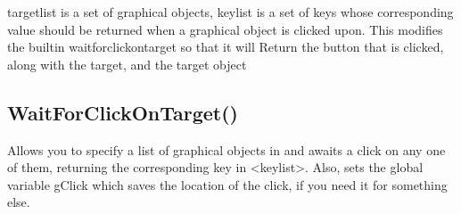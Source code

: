 \documentclass[letterpaper,10pt,english]{sphinxmanual}
\begin{document}
\sphinxAtStartPar
targetlist is a set of graphical objects,
keylist is a set of keys whose corresponding
value should be returned when a graphical object is clicked upon.
This modifies the built\sphinxhyphen{}in waitforclickontarget so that it will
Return the button that is clicked, along with the target,
and the target object

\sphinxAtStartPar
{}

\begin{sphinxVerbatim}[commandchars=\\\{\}]
\end{sphinxVerbatim}

\ignorespaces 

\subsection{WaitForClickOnTarget()}
\label{\detokenize{reference/utility:waitforclickontarget}}\label{\detokenize{reference/utility:index-42}}
\sphinxAtStartPar
{}

\sphinxAtStartPar
{}

\sphinxAtStartPar
Allows you to specify a list of graphical objects in  and awaits a click   on any one of them, returning the corresponding key in \textless{}keylist\textgreater{}.  Also, sets the    global variable gClick which saves the location of the click, if    you need it for something else.

\sphinxAtStartPar
{}

\begin{sphinxVerbatim}[commandchars=\\\{\}]
\end{sphinxVerbatim}

\sphinxAtStartPar
{}
\end{document}
